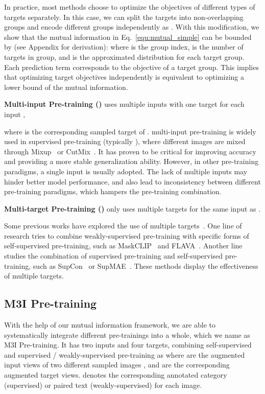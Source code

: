 \documentclass[10pt,twocolumn,letterpaper]{article}
\newcommand\smallalign[1]{\begingroup\small
    \setlength{\abovedisplayskip}{0.7em}
    \setlength{\belowdisplayskip}{0.7em}
    \setlength{\abovedisplayshortskip}{0.7em}
    \setlength{\belowdisplayshortskip}{0.7em}
    {#1}\endgroup}
\def\name{M3I Pre-training}
\begin{document}
In practice, most methods choose to optimize the objectives of different types of targets separately. In this case, we can split the targets  into  non-overlapping groups and encode different groups independently as . With this modification, we show that the mutual information in Eq.~\eqref{equ:mutual_simple} can be bounded by (see Appendix for derivation):
\smallalign{}\vspace{-1em}
\smallalign{}where  is the group index,  is the number of targets in  group, and  is the approximated distribution for each target group.
Each prediction term corresponds to the objective of a target group. This implies that optimizing target objectives independently is equivalent to optimizing a lower bound of the mutual information.




\vspace{0.5em}\noindent\textbf{Multi-input Pre-training ()} uses multiple inputs with one target for each input ,

where  is the corresponding sampled target of .
multi-input pre-training is widely used in supervised pre-training (typically ), where different images are mixed through Mixup~\cite{zhang2017mixup} or CutMix~\cite{yun2019cutmix}. It has proven to be critical for improving accuracy and providing a more stable generalization ability. However, in other pre-training paradigms, a single input is usually adopted. The lack of multiple inputs may hinder better model performance, and also lead to inconsistency between different pre-training paradigms, which hampers the pre-training combination.

\vspace{0.5em}\noindent\textbf{Multi-target Pre-training ()} only uses multiple targets for the same input as .

Some previous works have explored the use of multiple targets~\cite{yu2022coca,singh2022flava,khosla2020supervised,liang2022supmae}. One line of research tries to combine weakly-supervised pre-training with specific forms of self-supervised pre-training, such as MaskCLIP~\cite{dong2022maskclip} and FLAVA~\cite{singh2022flava}. Another line studies the combination of supervised pre-training and self-supervised pre-training, such as SupCon~\cite{khosla2020supervised} or SupMAE~\cite{liang2022supmae}. These methods display the effectiveness of multiple targets.



\subsection{\name{}}
\label{subsec:theory_mix}
With the help of our mutual information framework, we are able to systematically integrate different pre-trainings into a whole, which we name as \name{}. 
It has two inputs and four targets, combining self-supervised and supervised / weakly-supervised pre-training as
\smallalign{}where  are the augmented input views of two different sampled images , and  are the corresponding augmented target views.  denotes the corresponding annotated category (supervised) or paired text (weakly-supervised) for each image.
\end{document}
